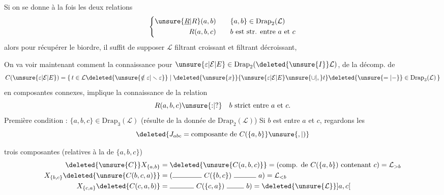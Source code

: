 Si on se donne à la fois les deux relations
\[
\left\{\begin{aligned}
\unsure{\underline R|R}(a,b)&\qquad \{a,b\}\in\mathrm{Drap}_2(\mathcal L)\\
R(a,b,c)&\qquad b\text{ est str. entre }a\text{ et }c
\end{aligned}\right.
\]
alors pour récupérer le biordre, il suffit de supposer $\mathcal L$ filtrant croissant et filtrant décroissant,  

 On va voir maintenant comment la connaissance pour $\unsure{\varepsilon|\mathcal E|E}\in\mathrm{Drap}_2(\deleted{\unsure{I}}\mathcal L)$, de la décomp. de
\[
 C(\unsure{\varepsilon|\mathcal E|E})=\{\,t\in\mathcal L\deleted{\unsure{\notin\varepsilon|\smallsetminus\varepsilon}}\mid
 \deleted{\unsure{x}}\{\unsure{\varepsilon|\mathcal E|E}\unsure{\cup|,}t\}\deleted{\unsure{=|-}}\in\mathrm{Drap}_3(\mathcal L)\,\}
\]
en composantes connexes, implique la connaissance de la relation
\[
 R(a,b,c)\unsure{\mathord{:}|\mathord{?}}\quad b\text{ strict entre }a\text{ et }c.
\]
Première condition : $\{a,b,c\}\in\mathrm{Drap}_3(\mathcal L)$ (résulte de la donnée de $\mathrm{Drap}_2(\mathcal L)$)
Si $b$ est entre $a$ et $c$, regardons les
\[
 \deleted{J_{abc}=\text{composante de }C(\{a,b\}}\unsure{,|)}
\]

trois composantes (relatives à la  de $\{a,b,c\}$)
\[
\begin{aligned}
\deleted{\unsure{C}}X_{\{a,b\}}&=\deleted{\unsure{C(a,b,c)}}=(\text{comp. de }C(\{a,b\})\text{ contenant }c)=\mathcal L_{>b}\\
X_{\{b,c\}}\deleted{\unsure{C(b,c,a)}}&=(\rule{1.45cm}{.4pt}\ C(\{b,c\})\ \rule{1.1cm}{.4pt}\ a)=\mathcal L_{<b}\\
X_{\{c,a\}}\deleted{C(c,a,b)}&=\rule{1.2cm}{.4pt}\ C(\{c,a\})\ \rule{.85cm}{.4pt}\ b)=\deleted{\unsure{\mathcal L}}\mathopen{]}a,c\mathclose{[}
\end{aligned}
\]

